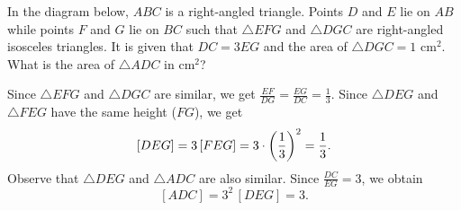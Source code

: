 \begin{question}[3]\label{Q::2024-J-1-20}
    In the diagram below, $ABC$ is a right-angled triangle. Points $D$ and $E$ lie on $AB$ while points $F$ and $G$ lie on $BC$ such that $\triangle EFG$ and $\triangle DGC$ are right-angled isosceles triangles. It is given that $DC = 3EG$ and the area of $\triangle DGC = 1$ cm$^2$. What is the area of $\triangle ADC$ in cm$^2$?

    \begin{center}
    \end{center}
\end{question}
\begin{solution*}
    Since $\triangle EFG$ and $\triangle DGC$ are similar, we get $\frac{EF}{DG} = \frac{EG}{DC} = \frac13$. Since $\triangle DEG$ and $\triangle FEG$ have the same height ($FG$), we get \[[DEG] = 3 \, [FEG] = 3 \cdot \left( \frac13 \right)^2 = \frac13.\] Observe that $\triangle DEG$ and $\triangle ADC$ are also similar. Since $\frac{DC}{EG} = 3$, we obtain \[[ADC] = 3^2 \, [DEG] = 3.\]
\end{solution*}

